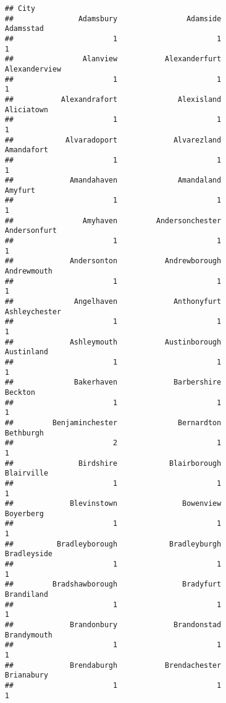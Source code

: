 \documentclass[
]{article}
\begin{document}
\begin{verbatim}
## City
##               Adamsbury                Adamside               Adamsstad 
##                       1                       1                       1 
##                Alanview           Alexanderfurt           Alexanderview 
##                       1                       1                       1 
##           Alexandrafort              Alexisland              Aliciatown 
##                       1                       1                       1 
##            Alvaradoport             Alvarezland              Amandafort 
##                       1                       1                       1 
##             Amandahaven              Amandaland                 Amyfurt 
##                       1                       1                       1 
##                Amyhaven         Andersonchester            Andersonfurt 
##                       1                       1                       1 
##             Andersonton           Andrewborough             Andrewmouth 
##                       1                       1                       1 
##              Angelhaven             Anthonyfurt           Ashleychester 
##                       1                       1                       1 
##             Ashleymouth           Austinborough              Austinland 
##                       1                       1                       1 
##              Bakerhaven             Barbershire                 Beckton 
##                       1                       1                       1 
##         Benjaminchester              Bernardton               Bethburgh 
##                       2                       1                       1 
##               Birdshire            Blairborough              Blairville 
##                       1                       1                       1 
##             Blevinstown               Bowenview               Boyerberg 
##                       1                       1                       1 
##          Bradleyborough            Bradleyburgh             Bradleyside 
##                       1                       1                       1 
##         Bradshawborough               Bradyfurt              Brandiland 
##                       1                       1                       1 
##             Brandonbury             Brandonstad             Brandymouth 
##                       1                       1                       1 
##             Brendaburgh           Brendachester              Brianabury 
##                       1                       1                       1 

\end{verbatim}
\end{document}
